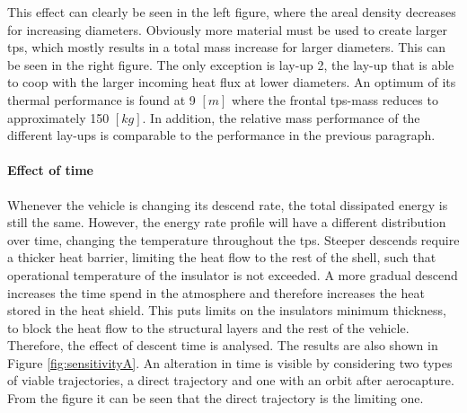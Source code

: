This effect can clearly be seen in the left figure, where the areal density decreases for increasing diameters. Obviously more material must be used to create larger \gls{tps}, which mostly results in a total mass increase for larger diameters. This can be seen in the right figure. The only exception is lay-up 2, the lay-up that is able to coop with the larger incoming heat flux at lower diameters. An optimum of its thermal performance is found at 9 $ \left[ m \right]$ where the frontal \gls{tps}-mass reduces to approximately 150 $ \left[ kg \right]$. In addition, the relative mass performance of the different lay-ups is comparable to the performance in the previous paragraph.

\paragraph{Effect of time}
Whenever the vehicle is changing its descend rate, the total dissipated energy is still the same. However, the energy rate profile will have a different distribution over time, changing the temperature throughout the \gls{tps}. Steeper descends require a thicker heat barrier, limiting the heat flow to the rest of the shell, such that operational temperature of the insulator is not exceeded. A more gradual descend increases the time spend in the atmosphere and therefore increases the heat stored in the heat shield. This puts limits on the insulators minimum thickness, to block the heat flow to the structural layers and the rest of the vehicle. Therefore, the effect of descent time is analysed. The results are also shown in Figure \ref{fig:sensitivityA}. An alteration in time is visible by considering two types of viable trajectories, a direct trajectory and one with an orbit after aerocapture. From the figure it can be seen that the direct trajectory is the limiting one. \\
